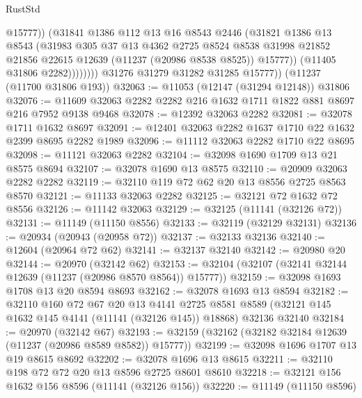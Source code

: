 \begin{lexlean}{RustStd}
\begin{coremodule}
                        @15777))
                    (@31841
                      @1386
                      @112
                      @13
                      @16
                      @8543
                      @2446
                      (@31821
                        @1386
                        @13
                        @8543
                        (@31983
                          @305
                          @37
                          @13
                          @4362
                          @2725
                          @8524
                          @8538
                          @31998
                          @21852
                          @21856
                          @22615
                          @12639
                          (@11237 (@20986 @8538 @8525))
                          @15777))
                      (@11405 @31806 @2282))))))))
        @31276
        @31279
        @31282
        @31285
        @15777))
    (@11237 (@11700 @31806 @193))
@32063 := @11053 (@12147 (@31294 @12148)) @31806
@32076 := @11609 @32063 @2282 @2282 @216 @1632 @1711 @1822 @881 @8697 @216 @7952 @9138 @9468
@32078 := @12392 @32063 @2282
@32081 := @32078 @1711 @1632 @8697
@32091 := @12401 @32063 @2282 @1637 @1710 @22 @1632 @2399 @8695 @2282 @1989
@32096 := @11112 @32063 @2282 @1710 @22 @8695
@32098 := @11121 @32063 @2282
@32104 := @32098 @1690 @1709 @13 @21 @8575 @8694
@32107 := @32078 @1690 @13 @8575
@32110 := @20909 @32063 @2282 @2282
@32119 := @32110 @119 @72 @62 @20 @13 @8556 @2725 @8563 @8570
@32121 := @11133 @32063 @2282
@32125 := @32121 @72 @1632 @72 @8556
@32126 := @11142 @32063
@32129 := @32125 (@11141 (@32126 @72))
@32131 := @11149 (@11150 @8556)
@32133 := @32119 (@32129 @32131)
@32136 := @20934 (@20943 (@20958 @72))
@32137 := @32133 @32136
@32140 := @12604 (@20964 @72 @62)
@32141 := @32137 @32140
@32142 := @20980 @20
@32144 := @20970 (@32142 @62)
@32153 := @32104 (@32107 (@32141 @32144 @12639 (@11237 (@20986 @8570 @8564)) @15777))
@32159 := @32098 @1693 @1708 @13 @20 @8594 @8693
@32162 := @32078 @1693 @13 @8594
@32182 := @32110
    @160
    @72
    @67
    @20
    @13
    @4141
    @2725
    @8581
    @8589
    (@32121 @145 @1632 @145 @4141 (@11141 (@32126 @145)) @18868)
    @32136
    @32140
@32184 := @20970 (@32142 @67)
@32193 := @32159 (@32162 (@32182 @32184 @12639 (@11237 (@20986 @8589 @8582)) @15777))
@32199 := @32098 @1696 @1707 @13 @19 @8615 @8692
@32202 := @32078 @1696 @13 @8615
@32211 := @32110 @198 @72 @72 @20 @13 @8596 @2725 @8601 @8610
@32218 := @32121 @156 @1632 @156 @8596 (@11141 (@32126 @156))
@32220 := @11149 (@11150 @8596)

\end{coremodule}
\end{lexlean}
